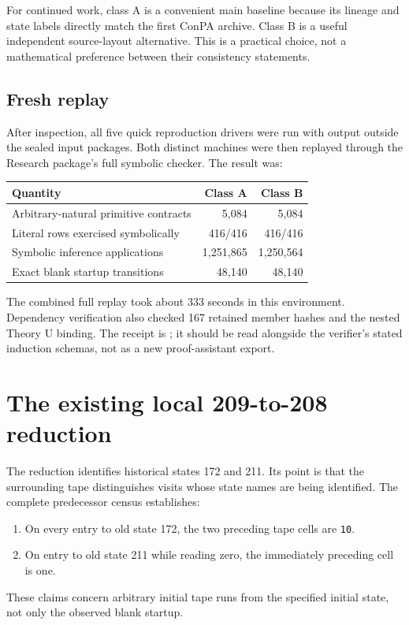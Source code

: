 \documentclass[11pt,a4paper]{article}
\newcommand{\code}[1]{\texttt{#1}}
\begin{document}
For continued work, class A is a convenient main baseline because its
lineage and state labels directly match the first ConPA archive. Class B is
a useful independent source-layout alternative. This is a practical choice,
not a mathematical preference between their consistency statements.

\subsection{Fresh replay}

After inspection, all five quick reproduction drivers were run with output
outside the sealed input packages. Both distinct machines were then replayed
through the Research package's full symbolic checker. The result was:
\begin{center}
\begin{tabular}{@{}lrr@{}}
\toprule
Quantity & Class A & Class B\\
\midrule
Arbitrary-natural primitive contracts & 5,084 & 5,084\\
Literal rows exercised symbolically & 416/416 & 416/416\\
Symbolic inference applications & 1,251,865 & 1,250,564\\
Exact blank startup transitions & 48,140 & 48,140\\
\bottomrule
\end{tabular}
\end{center}
The combined full replay took about 333 seconds in this environment.
Dependency verification also checked 167 retained member hashes and the
nested Theory U binding. The receipt is
; it should be read alongside
the verifier's stated induction schemas, not as a new proof-assistant export.

\section{The existing local 209-to-208 reduction}

The reduction identifies historical states 172 and 211. Its point is that
the surrounding tape distinguishes visits whose state names are being
identified. The complete predecessor census establishes:
\begin{enumerate}
\item On every entry to old state 172, the two preceding tape cells are
      \code{10}.
\item On entry to old state 211 while reading zero, the immediately
      preceding cell is one.
\end{enumerate}
These claims concern arbitrary initial tape runs from the specified initial
state, not only the observed blank startup.
\end{document}
